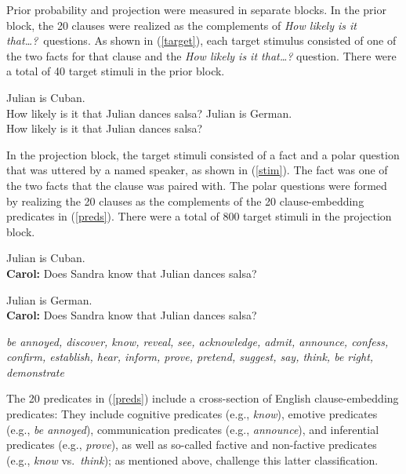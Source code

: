 \documentclass[11pt,fleqn]{article}
\newcommand{\6}{\mbox{$[\hspace*{-.6mm}[$}}
\newcommand{\9}{\mbox{$]\hspace*{-.6mm}]$}}
\begin{document}
Prior probability and projection were measured in separate blocks. In the prior block, the 20 clauses were realized as the complements of {\em How likely is it that\ldots?}~questions. As shown in (\ref{target}), each target stimulus consisted of one of the two facts for that clause and the {\em How likely is it that\ldots?} question. There were a total of 40 target stimuli in the prior block.

\begin{exe}
\ex\label{target}  %
\begin{xlist}
 Julian is Cuban. \\ How likely is it that Julian dances salsa?
 Julian is German.  \\ How likely is it that Julian dances salsa?
\end{xlist}
\end{exe}

In the projection block, the target stimuli consisted of a fact and a polar question that was uttered by a named speaker, as shown in (\ref{stim}). The fact was one of the two facts that the clause was paired with. The polar questions were formed by realizing the 20 clauses as the complements of the 20 clause-embedding predicates in (\ref{preds}).  There were a total of 800 target stimuli in the projection block.

\begin{exe}
\ex\label{stim} %
\begin{xlist}
 Julian is Cuban.  \\ 
{\bf Carol:} Does Sandra know that Julian dances salsa?

 Julian is German.  \\ 
{\bf Carol:} Does Sandra know that Julian dances salsa?
\end{xlist}
\end{exe}

\begin{exe}
\ex\label{preds} %

{\em be annoyed, discover, know, reveal, see, acknowledge, admit, announce, confess, confirm, establish, hear, inform, prove, pretend, suggest, say, think, be right, demonstrate}
\end{exe}
The 20 predicates in (\ref{preds}) include a cross-section of English clause-embedding predicates: They include cognitive predicates (e.g., {\em know}), emotive predicates (e.g., {\em be annoyed}), communication predicates (e.g., {\em announce}), and inferential predicates (e.g., {\em prove}), as well as so-called factive and non-factive predicates (e.g., {\em know} vs.\ {\em think}); as mentioned above, \citealt{tonhauser-degen-factive} challenge this latter classification.
\end{document}
